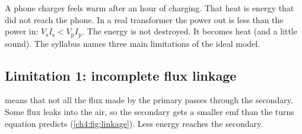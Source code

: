 A phone charger feels warm after an hour of charging. That heat is energy that did not
reach the phone. In a real transformer the power out is less than the power in:
$V_\mathrm{s}I_\mathrm{s} < V_\mathrm{p}I_\mathrm{p}$. The energy is not destroyed. It
becomes heat (and a little sound). The syllabus names three main limitations of the
ideal model.

\subsection{Limitation 1: incomplete flux linkage}

 means that not all the flux made by the primary passes
through the secondary. Some flux leaks into the air, so the secondary gets a smaller emf
than the turns equation predicts (\cref{ch4:fig:linkage}). Less energy reaches the
secondary.

